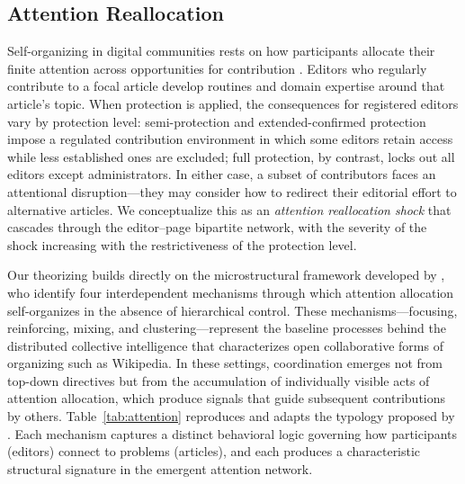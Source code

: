 \documentclass[11pt]{article}
\begin{document}
\subsection{Attention Reallocation}

Self-organizing in digital communities rests on how participants allocate their finite attention across opportunities for contribution \citep{Tonellato2024}. Editors who regularly contribute to a focal article develop routines and domain expertise around that article's topic. When protection is applied, the consequences for registered editors vary by protection level: semi-protection and extended-confirmed protection impose a regulated contribution environment in which some editors retain access while less established ones are excluded; full protection, by contrast, locks out all editors except administrators. In either case, a subset of contributors faces an attentional disruption---they may consider how to redirect their editorial effort to alternative articles. We conceptualize this as an \emph{attention reallocation shock} that cascades through the editor--page bipartite network, with the severity of the shock increasing with the restrictiveness of the protection level.

Our theorizing builds directly on the microstructural framework developed by \citet{Tonellato2024}, who identify four interdependent mechanisms through which attention allocation self-organizes in the absence of hierarchical control. These mechanisms---focusing, reinforcing, mixing, and clustering---represent the baseline processes behind the distributed collective intelligence that characterizes open collaborative forms of organizing such as Wikipedia. In these settings, coordination emerges not from top-down directives but from the accumulation of individually visible acts of attention allocation, which produce signals that guide subsequent contributions by others. Table~\ref{tab:attention} reproduces and adapts the typology proposed by \citet{Tonellato2024}. Each mechanism captures a distinct behavioral logic governing how participants (editors) connect to problems (articles), and each produces a characteristic structural signature in the emergent attention network.
\end{document}
